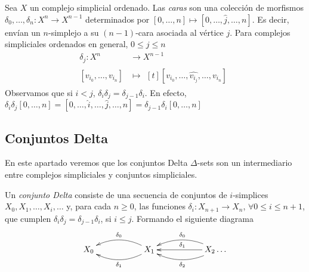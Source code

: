 \documentclass[../main.tex]{subfiles}
\begin{document}
\begin{defi}
    Sea $X$ un complejo simplicial ordenado. Las \emph{caras} son una colecci\'on de morfismos $\delta_0,\dots,\delta_n\colon X^n\to X^{n-1}$ determinados por $[0,\dots,n] \mapsto [0,\dots,\hat{j},\dots,n]$. Es decir, env\'ian un $n$-simplejo a su $(n-1)$-cara asociada al v\'ertice $j$.
    Para complejos simpliciales ordenados en general, $0\le j \le n$
    \begin{align*}
        \delta_j: X^n           & \longrightarrow X^{n-1} \\
        [v_{i_0},\dots,v_{i_n}] & \longmapsto\!
        \begin{aligned}[t]
            [v_{i_0},\dots,\hat{v_{i_j}},\dots,v_{i_n}]
        \end{aligned}
    \end{align*}
    Observamos que si $i<j$, $\delta_i\delta_j = \delta_{j-1}\delta_{i}$. En efecto, $\delta_i\delta_j[0,\dots,n] = [0,\dots,\hat{i},\dots,\hat{j},\dots,n] = \delta_{j-1}\delta_{i}[0,\dots,n]$
\end{defi}


\subsection{Conjuntos Delta}
En este apartado veremos que los conjuntos Delta $\Delta$-sets son un intermediario entre complejos simpliciales y conjuntos simpliciales.
\begin{defi}
    Un \emph{conjunto Delta} consiste de una secuencia de conjuntos de $i$-simplices $X_0,X_1,\dots,X_i,\dots$ y, para cada $n\ge 0$, las funciones $\delta_i: X_{n+1} \to X_n$, $\forall 0\le i \le n+1$, que cumplen $\delta_i\delta_j = \delta_{j-1}\delta_{i}$, si $i\le j$.
    Formando el siguiente diagrama
    $$
        \xymatrix{
        X_0  & & X_1  \ar@/{}_{1pc}/[ll]_{\delta_0} \ar@/{}^{1pc}/[ll]^{\delta_1} & & X_2 \ar@/{}_{1pc}/[ll]_{\delta_0} \ar@/{}^{1pc}/[ll]^{\delta_2} \ar[ll]_{\delta_1} \dots
        }
    $$
\end{defi}

\newpage
\end{document}
